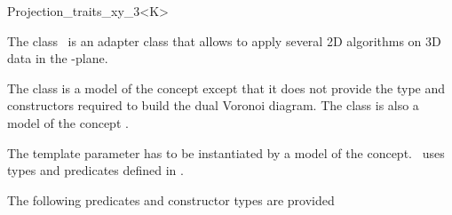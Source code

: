 
\begin{ccRefClass}{Projection_traits_xy_3<K>}  %

\ccDefinition
  
The class \ccRefName\ is an adapter class that allows to apply several 2D algorithms
on 3D data in the -plane.

The class is a model of the concept  
except that it does not provide the type and constructors
required to build the dual Voronoi diagram. The class is also a model
of the concept .

\ccParameters
The template parameter   has to
be instantiated by a model of the  concept.
\ccRefName\ uses types 
and predicates defined in .


\ccIsModel
{}

\ccTypes
{}
\ccGlue
{}
\ccGlue
{}
\ccGlue
{}

The following predicates and constructor types are provided


\end{ccRefClass}

